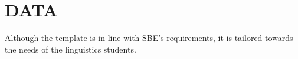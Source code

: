 \chapter{\MakeUppercase{data}}
Although the template is in line with SBE's requirements, it is tailored towards the needs of the linguistics students.













